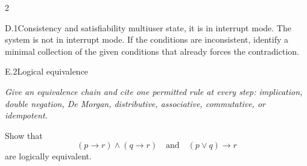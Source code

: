 \documentclass[9pt]{extarticle}
\begin{document}
\begin{multicols}{2}
\begin{CoreProblem}{D.1}{Consistency and satisfiability}
multiuser state, it is in interrupt mode. The system is not in interrupt mode.
If the conditions are inconsistent, identify a minimal collection of the given
conditions that already forces the contradiction.
\end{CoreProblem}
\begin{CoreProblem}{E.2}{Logical equivalence}
{\scriptsize\textit{Give an equivalence chain and cite one permitted rule at every step: implication, double negation, De Morgan, distributive, associative, commutative, or idempotent.}\par}
Show that
\[
  (p\to r)\land(q\to r)
  \quad\text{and}\quad
  (p\lor q)\to r
\]
are logically equivalent.
\end{CoreProblem}
\end{multicols}
\CoreWorkArea
\FormBreak
{}
\end{document}
